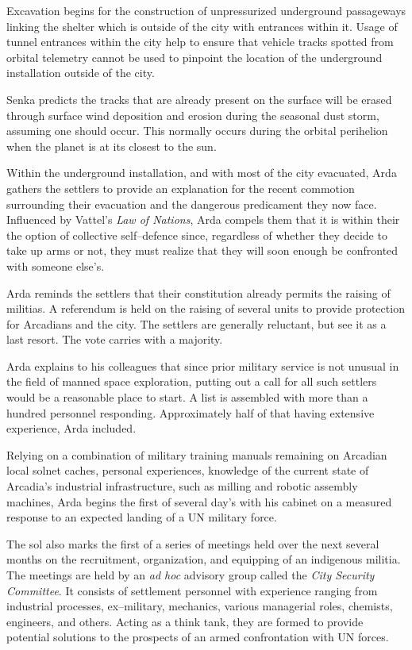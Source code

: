 Excavation begins for the construction of unpressurized underground passageways linking the shelter which is outside of the city with entrances within it. Usage of tunnel entrances within the city help to ensure that vehicle tracks spotted from orbital telemetry cannot be used to pinpoint the location of the underground installation outside of the city. 

Senka predicts the tracks that are already present on the surface will be erased through surface wind deposition and erosion during the seasonal dust storm, assuming one should occur. This normally occurs during the orbital perihelion when the planet is at its closest to the sun.

Within the underground installation, and with most of the city evacuated, Arda gathers the settlers to provide an explanation for the recent commotion surrounding their evacuation and the dangerous predicament they now face. Influenced by Vattel's {\it Law of Nations}, Arda compels them that it is within their  the option of collective self--defence since, regardless of whether they decide to take up arms or not, they must realize that they will soon enough be confronted with someone else's.

Arda reminds the settlers that their constitution already permits the raising of militias. A referendum is held on the raising of several units to provide protection for Arcadians and the city. The settlers are generally reluctant, but see it as a last resort. The vote carries with a majority.

Arda explains to his colleagues that since prior military service is not unusual in the field of manned space exploration, putting out a call for all such settlers would be a reasonable place to start. A list is assembled with more than a hundred personnel responding. Approximately half of that having extensive experience, Arda included.
\StopTimelineDate

Relying on a combination of military training manuals remaining on Arcadian local solnet caches, personal experiences, knowledge of the current state of Arcadia's industrial infrastructure, such as milling and robotic assembly machines, Arda begins the first of several day's with his cabinet on a measured response to an expected landing of a UN military force.

The sol also marks the first of a series of meetings held over the next several months on the recruitment, organization, and equipping of an indigenous militia. The meetings are held by an {\it ad hoc} advisory group called the {\it City Security Committee}. It consists of settlement personnel with experience ranging from industrial processes, ex--military, mechanics, various managerial roles, chemists, engineers, and others. Acting as a think tank, they are formed to provide potential solutions to the prospects of an armed confrontation with UN forces.


